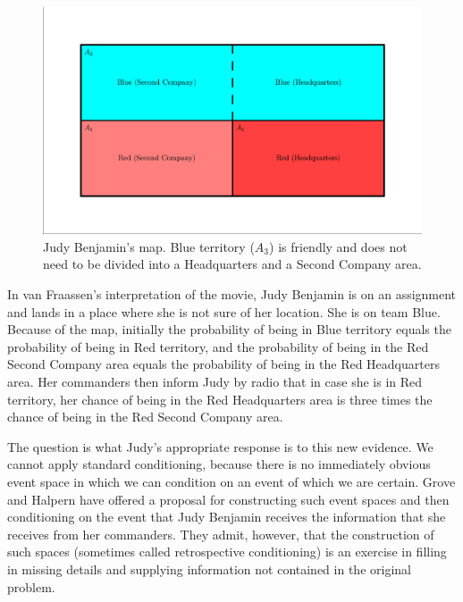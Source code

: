 \documentclass[phd,12pt,oneside]{ubcthesis}
\begin{document}
\begin{figure}[ht!]
    \begin{minipage}[h]{.7\linewidth}
      \includegraphics[width=\textwidth]{judy.eps}
      \caption{\footnotesize Judy Benjamin's map. Blue territory
        ($A_{3}$) is friendly and does not need to be divided into a
        Headquarters and a Second Company area.}
      \label{fig:map}
    \end{minipage}
\end{figure}

\begin{quotex}
  \label{ex:judybenjamin} In van Fraassen's
  interpretation of the movie, Judy Benjamin is on an assignment and
  lands in a place where she is not sure of her location. She is on
  team Blue. Because of the map, initially the probability of being in
  Blue territory equals the probability of being in Red territory, and
  the probability of being in the Red Second Company area equals the
  probability of being in the Red Headquarters area. Her commanders
  then inform Judy by radio that in case she is in Red territory, her
  chance of being in the Red Headquarters area is three times the
  chance of being in the Red Second Company area.
\end{quotex}

The question is what Judy's appropriate response is to this new
evidence. We cannot apply standard conditioning, because there is no
immediately obvious event space in which we can condition on an event
of which we are certain. Grove and Halpern 
have offered a proposal for constructing such event spaces and then
conditioning on the event that Judy Benjamin receives the information
that she receives from her commanders. They admit, however, that the
construction of such spaces (sometimes called retrospective
conditioning) is an exercise in filling in missing details and
supplying information not contained in the original problem.
\end{document}
